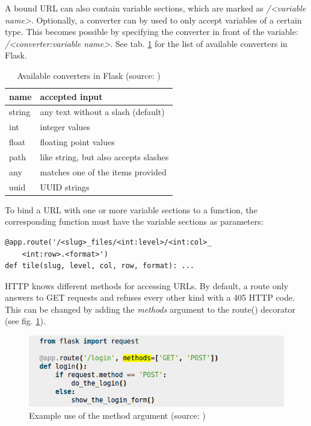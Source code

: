 A bound URL can also contain variable sections, which are marked as \emph{/{\textless}variable name{\textgreater}}. Optionally, a converter can by used to only accept variables of a certain type. This becomes possible by specifying the converter in front of the variable: \emph{/{\textless}converter:variable name{\textgreater}}\cite{web:flask}. See tab. \ref{tab4_converter} for the list of available converters in Flask.

\begin{table}[H]
	\begin{center}
		\begin{tabular}{| l | l |}
			\hline
			\textbf{name} & \textbf{accepted input}\\ \hline
			string & any text without a slash (default)\\ \hline
			int & integer values\\ \hline
			float & floating point values\\ \hline
			path & like string, but also accepts slashes \\ \hline
			any & matches one of the items provided\\ \hline
			uuid & UUID strings\\ \hline
		\end{tabular}
		\caption{Available converters in Flask (source: \cite{web:flask})}
		\label{tab4_converter}
	\end{center}
\end{table}

To bind a URL with one or more variable sections to a function, the corresponding function must have the variable sections as parameters:

\begin{lstlisting}[frame=single]
@app.route('/<slug>_files/<int:level>/<int:col>_
	<int:row>.<format>')
def tile(slug, level, col, row, format): ...
\end{lstlisting}

HTTP knows different methods for accessing URLs. By default, a route only answers to GET requests and refuses every other kind with a 405 HTTP code. This can be changed by adding the \emph{methods} argument to the route() decorator (see fig. \ref{fig4_methods})\cite{web:flask}.

\begin{figure}[H]
	\begin{center}
		\includegraphics[scale=0.5]{img/HTTPmethods.png}
		\caption{Example use of the method argument (source: \cite{web:flask})}
		\label{fig4_methods}
	\end{center}
\end{figure}

